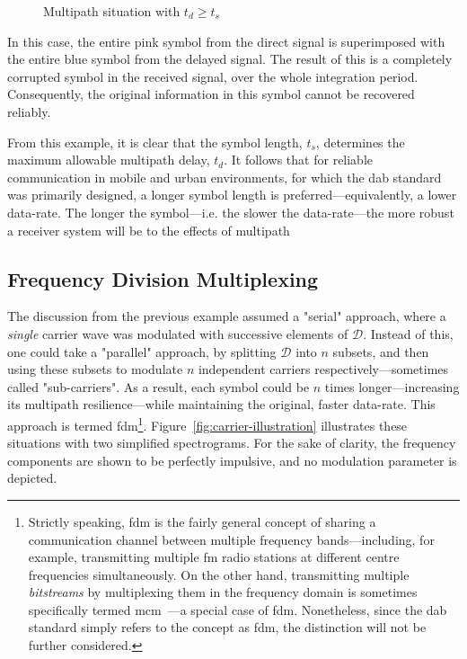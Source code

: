 \documentclass[class=report,11pt,crop=false]{standalone}
\begin{document}
\begin{figure}[htbp]
    \centering
    \captionsetup{type=figure}
    \def\svgwidth{0.8\linewidth}
    { %
        }
    \caption{Multipath situation with \(t_d \ge t_s\)}
    \label{fig:multipath-symbol-morethan}
\end{figure}

In this case, the entire pink symbol from the direct signal is superimposed with the entire blue symbol from the delayed signal. The result of this is a completely corrupted symbol in the received signal, over the whole integration period. Consequently, the original information in this symbol cannot be recovered reliably.

From this example, it is clear that the symbol length, \(t_s\), determines the maximum allowable multipath delay, \(t_d\). It follows that for reliable communication in mobile and urban environments, for which the \gls{dab} standard was primarily designed, a longer symbol length is preferred---equivalently, a lower data-rate. The longer the symbol---i.e. the slower the data-rate---the more robust a receiver system will be to the effects of multipath

\subsection{Frequency Division Multiplexing}
The discussion from the previous example assumed a "serial" approach, where a \emph{single} carrier wave was modulated with successive elements of \(\mathcal{D}\). Instead of this, one could take a "parallel" approach, by splitting \(\mathcal{D}\) into \(n\) subsets, and then using these subsets to modulate \(n\) independent carriers respectively---sometimes called "sub-carriers". As a result, each symbol could be \(n\) times longer---increasing its multipath resilience---while maintaining the original, faster data-rate. This approach is termed \gls{fdm}\footnote{Strictly speaking, \gls{fdm} is the fairly general concept of sharing a communication channel between multiple frequency bands---including, for example, transmitting multiple \gls{fm} radio stations at different centre frequencies simultaneously. On the other hand, transmitting multiple \emph{bitstreams} by multiplexing them in the frequency domain is sometimes specifically termed \gls{mcm}~\cite{Bingham1990}---a special case of \gls{fdm}. Nonetheless, since the \gls{dab} standard simply refers to the concept as \gls{fdm}, the distinction will not be further considered.}. Figure~\ref{fig:carrier-illustration} illustrates these situations with two simplified spectrograms. For the sake of clarity, the frequency components are shown to be perfectly impulsive, and no modulation parameter is depicted.
\end{document}
